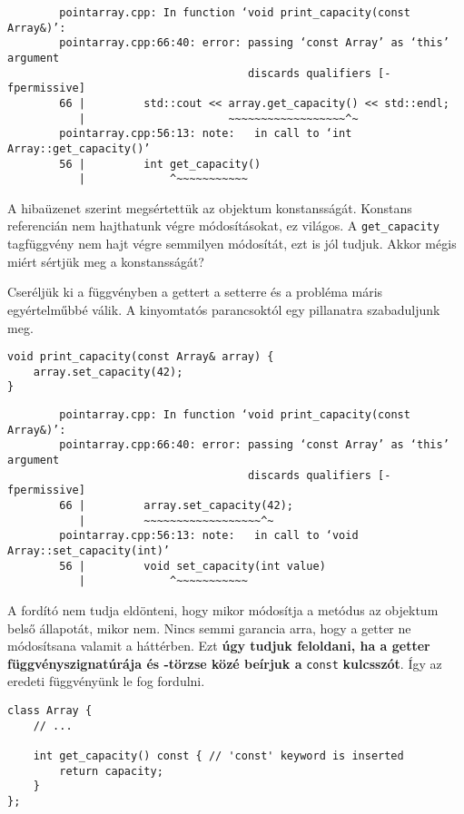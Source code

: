 \documentclass[a4paper, 11pt, oneside]{book}
\begin{document}
\begin{framed}
	\begin{verbatim}
		pointarray.cpp: In function ‘void print_capacity(const Array&)’:
		pointarray.cpp:66:40: error: passing ‘const Array’ as ‘this’ argument 
		                             discards qualifiers [-fpermissive]
		66 |         std::cout << array.get_capacity() << std::endl;
		   |                      ~~~~~~~~~~~~~~~~~~^~
		pointarray.cpp:56:13: note:   in call to ‘int Array::get_capacity()’
		56 |         int get_capacity()
		   |             ^~~~~~~~~~~~
	\end{verbatim}
\end{framed}

A hibaüzenet szerint megsértettük az objektum konstansságát. Konstans referencián nem hajthatunk végre módosításokat, ez világos. A \verb*|get_capacity| tagfüggvény nem hajt végre semmilyen módosítát, ezt is jól tudjuk. Akkor mégis miért sértjük meg a konstansságát?

Cseréljük ki a függvényben a gettert a setterre és a probléma máris egyértelműbbé válik. A kinyomtatós parancsoktól egy pillanatra szabaduljunk meg.

\begin{lstlisting}[style=cppstyle]	
void print_capacity(const Array& array) {
	array.set_capacity(42);
}
\end{lstlisting}

\begin{framed}
	\begin{verbatim}
		pointarray.cpp: In function ‘void print_capacity(const Array&)’:
		pointarray.cpp:66:40: error: passing ‘const Array’ as ‘this’ argument 
		                             discards qualifiers [-fpermissive]
		66 |         array.set_capacity(42);
		   |         ~~~~~~~~~~~~~~~~~~^~
		pointarray.cpp:56:13: note:   in call to ‘void Array::set_capacity(int)’
		56 |         void set_capacity(int value)
		   |             ^~~~~~~~~~~~
	\end{verbatim}
\end{framed}

A fordító nem tudja eldönteni, hogy mikor módosítja a metódus az objektum belső állapotát, mikor nem. Nincs semmi garancia arra, hogy a getter ne módosítsana valamit a háttérben. Ezt \textbf{úgy tudjuk feloldani, ha a getter függvényszignatúrája és -törzse közé beírjuk a} \verb*|const| \textbf{kulcsszót}. Így az eredeti függvényünk le fog fordulni.

\begin{lstlisting}[style=cppstyle]	
class Array {
	// ...
	
	int get_capacity() const { // 'const' keyword is inserted
		return capacity; 
	}
};
\end{lstlisting}
\end{document}
